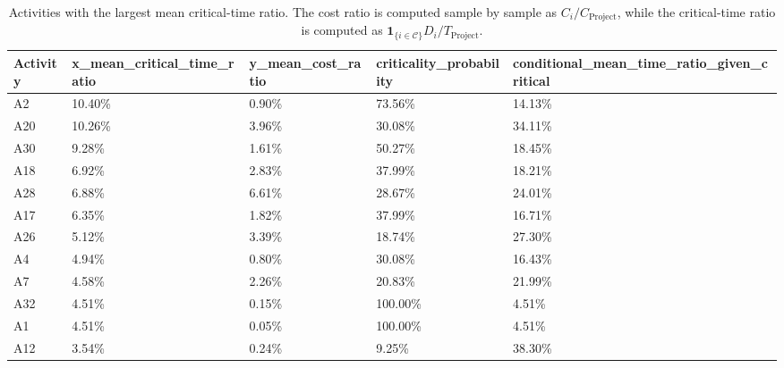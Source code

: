 \begin{table}
\caption{Activities with the largest mean critical-time ratio. The cost ratio is computed sample by sample as $C_i/C_{\mathrm{Project}}$, while the critical-time ratio is computed as $\mathbf{1}_{\{i \in \mathcal{C}\}}D_i/T_{\mathrm{Project}}$.}
\label{tab:top-activity-cost-critical-time-metric}
\begin{tabular}{lllll}
\toprule
Activity & x_mean_critical_time_ratio & y_mean_cost_ratio & criticality_probability & conditional_mean_time_ratio_given_critical \\
\midrule
A2 & 10.40\% & 0.90\% & 73.56\% & 14.13\% \\
A20 & 10.26\% & 3.96\% & 30.08\% & 34.11\% \\
A30 & 9.28\% & 1.61\% & 50.27\% & 18.45\% \\
A18 & 6.92\% & 2.83\% & 37.99\% & 18.21\% \\
A28 & 6.88\% & 6.61\% & 28.67\% & 24.01\% \\
A17 & 6.35\% & 1.82\% & 37.99\% & 16.71\% \\
A26 & 5.12\% & 3.39\% & 18.74\% & 27.30\% \\
A4 & 4.94\% & 0.80\% & 30.08\% & 16.43\% \\
A7 & 4.58\% & 2.26\% & 20.83\% & 21.99\% \\
A32 & 4.51\% & 0.15\% & 100.00\% & 4.51\% \\
A1 & 4.51\% & 0.05\% & 100.00\% & 4.51\% \\
A12 & 3.54\% & 0.24\% & 9.25\% & 38.30\% \\
\bottomrule
\end{tabular}
\end{table}
